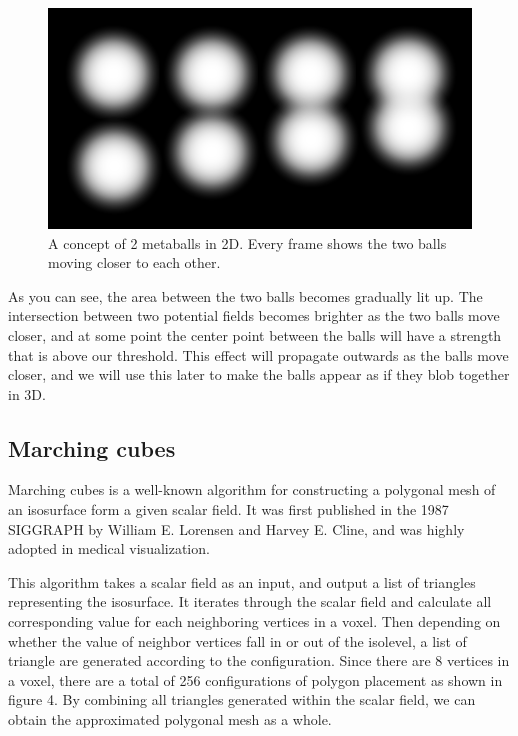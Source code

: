 \documentclass{article}
\begin{document}
\begin{multicols}{2}
        	\begin{figure}[H]
        		\centering
            	\begin{minipage}[b]{0.4\textwidth}
            		\includegraphics[width=\textwidth]{img/2d-potential-multi.png}
            		\caption{A concept of 2 metaballs in 2D. Every frame shows the two balls moving closer to each other.}
            		\label{fig:2d-potential-multi}
            	\end{minipage}
            \end{figure}

            As you can see, the area between the two balls becomes gradually lit up.
            The intersection between two potential fields becomes brighter as the two balls move closer, and at some point the center point between the balls will have a strength that is above our threshold. This effect will propagate outwards as the balls move closer, and we will use this later to make the balls appear as if they blob together in 3D.

        \subsection{Marching cubes}
			Marching cubes is a well-known algorithm for constructing a polygonal mesh of an isosurface form a given scalar field. It was first published in the 1987 SIGGRAPH by William E. Lorensen and Harvey E. Cline, and was highly adopted in medical visualization.
			
			This algorithm takes a scalar field as an input, and output a list of triangles representing the isosurface. It iterates through the scalar field and calculate all corresponding value for each neighboring vertices in a voxel. Then depending on whether the value of neighbor vertices fall in or out of the isolevel, a list of triangle are generated according to the configuration. Since there are 8 vertices in a voxel, there are a total of 256 configurations of polygon placement as shown in figure 4. By combining all triangles generated within the scalar field, we can obtain the approximated polygonal mesh as a whole. 
			

\end{multicols}
\end{document}
